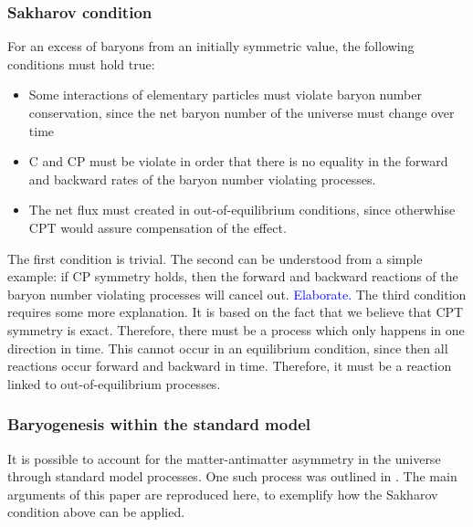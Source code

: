 \subsubsection{Sakharov condition}\label{sec:IntroSakharovContidion}
For an excess of baryons from an initially symmetric value, the following conditions must hold true:
\begin{itemize}
    \item Some interactions of elementary particles must violate baryon number conservation, since the net baryon number of the universe must change over time
    \item C and CP must be violate in order that there is no equality in the forward and backward rates of the baryon number violating processes. 
    \item The net flux must created in out-of-equilibrium conditions, since otherwhise CPT would assure compensation of the effect. 
\end{itemize}

The first condition is trivial. The second can be understood from a simple example: if CP symmetry holds, then the forward and backward reactions of the baryon number violating processes will cancel out. \textcolor{blue}{Elaborate. }
The third condition requires some more explanation. It is based on the fact that we believe that CPT symmetry is exact. Therefore, there must be a process which only happens in one direction in time. This cannot occur in an equilibrium condition, since then all reactions occur forward and backward in time. Therefore, it must be a reaction linked to out-of-equilibrium processes. 


\subsubsection{Baryogenesis within the standard model}
It is possible to account for the matter-antimatter asymmetry in the universe through standard model processes. One such process was outlined in \cite{Bubbles_asymmetry}. The main arguments of this paper are reproduced here, to exemplify how the Sakharov condition above can be applied. \\

